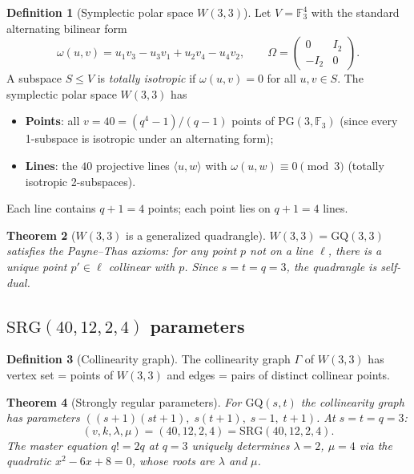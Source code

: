 \documentclass[12pt,a4paper]{article}
\newtheorem{theorem}{Theorem}[section]
\theoremstyle{definition}
\newtheorem{definition}[theorem]{Definition}
\newcommand{\SRG}{\mathrm{SRG}}
\newcommand{\GQ}{\mathrm{GQ}}
\newcommand{\PG}{\mathrm{PG}}
\newcommand{\FF}{\mathbb{F}}
\begin{document}
\begin{definition}[Symplectic polar space $W(3,3)$]
Let $V=\FF_3^4$ with the standard alternating bilinear form
\begin{equation}
  \omega(u,v) = u_1v_3 - u_3v_1 + u_2v_4 - u_4v_2,
  \qquad \Omega = \begin{pmatrix}0&I_2\\-I_2&0\end{pmatrix}.
\end{equation}
A subspace $S\le V$ is \emph{totally isotropic} if $\omega(u,v)=0$ for
all $u,v\in S$.  The symplectic polar space $W(3,3)$ has
\begin{itemize}[nosep]
\item \textbf{Points}: all $v=40=(q^4-1)/(q-1)$ points of $\PG(3,\FF_3)$
  (since every 1-subspace is isotropic under an alternating form);
\item \textbf{Lines}: the $40$ projective lines $\langle u,w\rangle$ with
  $\omega(u,w)\equiv 0\pmod{3}$ (totally isotropic 2-subspaces).
\end{itemize}
Each line contains $q+1=4$ points; each point lies on $q+1=4$ lines.
\end{definition}

\begin{theorem}[$W(3,3)$ is a generalized quadrangle]
$W(3,3)=\GQ(3,3)$ satisfies the Payne--Thas axioms: for any point $p$
not on a line $\ell$, there is a \emph{unique} point $p'\in\ell$
collinear with $p$.  Since $s=t=q=3$, the quadrangle is self-dual.
\end{theorem}

\subsection{\texorpdfstring{$\SRG(40,12,2,4)$}{SRG(40,12,2,4)} parameters}

\begin{definition}[Collinearity graph]
The collinearity graph $\Gamma$ of $W(3,3)$ has vertex set = points of
$W(3,3)$ and edges = pairs of distinct collinear points.
\end{definition}

\begin{theorem}[Strongly regular parameters]
\label{thm:srg}
For $\GQ(s,t)$ the collinearity graph has parameters
$((s+1)(st+1),\;s(t+1),\;s-1,\;t+1)$.  At $s=t=q=3$:
\begin{equation}
  (v,k,\lambda,\mu) = (40,12,2,4) = \SRG(40,12,2,4).
\end{equation}
The master equation $q!=2q$ at $q=3$ uniquely determines $\lambda=2$, $\mu=4$
via the quadratic $x^2-6x+8=0$, whose roots are $\lambda$ and $\mu$.
\end{theorem}
\end{document}
